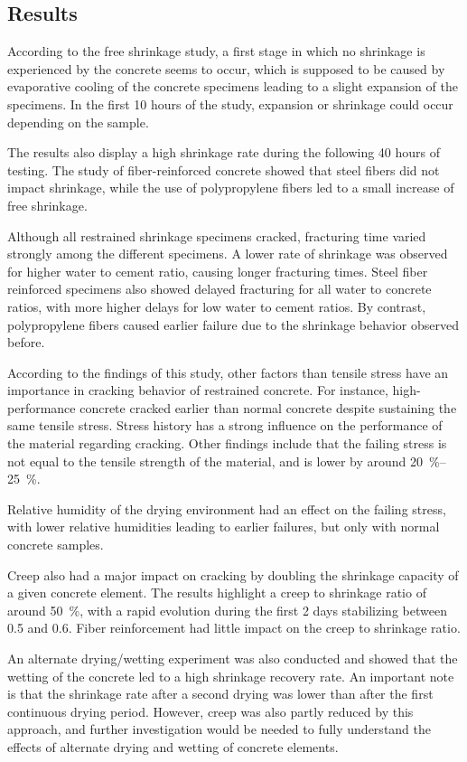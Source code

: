 \documentclass[a4paper,11pt]{memoir}
\begin{document}
\subsection{Results}
According to the free shrinkage study, a first stage in which no shrinkage is
experienced by the concrete seems to occur, which is supposed to be caused by
evaporative cooling of the concrete specimens leading to a slight expansion of
the specimens. In the first 10 hours of the study, expansion or shrinkage could
occur depending on the sample.

The results also display a high shrinkage rate during the following 40 hours of
testing. The study of fiber-reinforced concrete showed that steel fibers did
not impact shrinkage, while the use of polypropylene fibers led to a small
increase of free shrinkage.

Although all restrained shrinkage specimens cracked, fracturing time varied
strongly among the different specimens. A lower rate of shrinkage was observed
for higher water to cement ratio, causing longer fracturing times. Steel
fiber reinforced specimens also showed delayed fracturing for all water to
concrete ratios, with more higher delays for low water to cement ratios. By
contrast, polypropylene fibers caused earlier failure due to the shrinkage
behavior observed before.

According to the findings of this study, other factors than tensile stress have
an importance in cracking behavior of restrained concrete. For instance,
high-performance concrete cracked earlier than normal concrete despite
sustaining the same tensile stress. Stress history has a strong influence on
the performance of the material regarding cracking. Other findings include that
the failing stress is not equal to the tensile strength of the material, and is
lower by around \SIrange{20}{25}{\percent}.

Relative humidity of the drying environment had an effect on the failing
stress, with lower relative humidities leading to earlier failures, but only
with normal concrete samples.

Creep also had a major impact on cracking by doubling the shrinkage capacity of
a given concrete element. The results highlight a creep to shrinkage ratio of
around \SI{50}{\percent}, with a rapid evolution during the first 2 days
stabilizing between \num{0.5} and \num{.6}. Fiber reinforcement had little
impact on the creep to shrinkage ratio.

An alternate drying/wetting experiment was also conducted and showed that the
wetting of the concrete led to a high shrinkage recovery rate. An important
note is that the shrinkage rate after a second drying was lower than after the
first continuous drying period. However, creep was also partly reduced by this
approach, and further investigation would be needed to fully understand the
effects of alternate drying and wetting of concrete elements.
\end{document}
